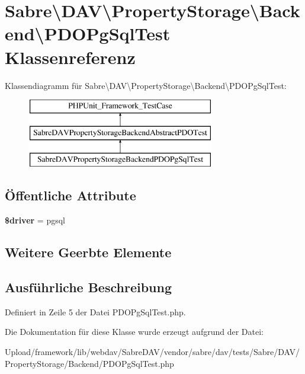 \hypertarget{class_sabre_1_1_d_a_v_1_1_property_storage_1_1_backend_1_1_p_d_o_pg_sql_test}{}\section{Sabre\textbackslash{}D\+AV\textbackslash{}Property\+Storage\textbackslash{}Backend\textbackslash{}P\+D\+O\+Pg\+Sql\+Test Klassenreferenz}
\label{class_sabre_1_1_d_a_v_1_1_property_storage_1_1_backend_1_1_p_d_o_pg_sql_test}
Klassendiagramm für Sabre\textbackslash{}D\+AV\textbackslash{}Property\+Storage\textbackslash{}Backend\textbackslash{}P\+D\+O\+Pg\+Sql\+Test\+:\begin{figure}[H]
\begin{center}
\leavevmode
\includegraphics[height=3.000000cm]{class_sabre_1_1_d_a_v_1_1_property_storage_1_1_backend_1_1_p_d_o_pg_sql_test}
\end{center}
\end{figure}
\subsection*{Öffentliche Attribute}
\begin{DoxyCompactItemize}
\item 
\mbox{\label{class_sabre_1_1_d_a_v_1_1_property_storage_1_1_backend_1_1_p_d_o_pg_sql_test_a0e4fb931bc5ccfbbca95c1d0ea1e330c}} 
{\bfseries \$driver} = \textquotesingle{}pgsql\textquotesingle{}
\end{DoxyCompactItemize}
\subsection*{Weitere Geerbte Elemente}


\subsection{Ausführliche Beschreibung}


Definiert in Zeile 5 der Datei P\+D\+O\+Pg\+Sql\+Test.\+php.



Die Dokumentation für diese Klasse wurde erzeugt aufgrund der Datei\+:\begin{DoxyCompactItemize}
\item 
Upload/framework/lib/webdav/\+Sabre\+D\+A\+V/vendor/sabre/dav/tests/\+Sabre/\+D\+A\+V/\+Property\+Storage/\+Backend/P\+D\+O\+Pg\+Sql\+Test.\+php\end{DoxyCompactItemize}
